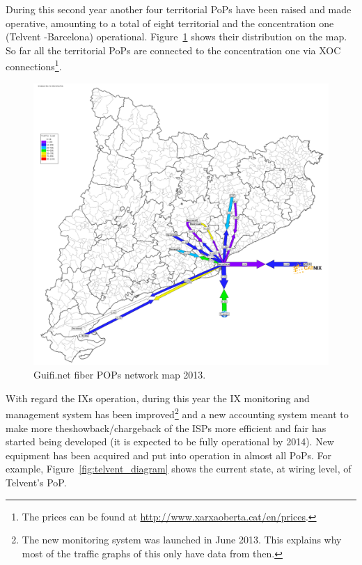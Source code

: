 During this second year another four territorial PoPs have been raised and made operative, amounting to a total of eight territorial and the concentration one (Telvent -Barcelona) operational. Figure~\ref{fig:pop_weathermap} shows their distribution on the map. So far all the territorial PoPs are connected to the concentration one via XOC connections\footnote{The prices can be found at \url{http://www.xarxaoberta.cat/en/prices}.}.

\begin{figure}[H]
  \centering
  \includegraphics[width=0.95\linewidth]{sect3/figures/weathermap.png} 
  \caption[Guifi.net fiber POPs network map 2013]{Guifi.net fiber POPs network map 2013.}
  \label{fig:pop_weathermap}
\end{figure}

With regard the IXs operation, during this year the IX monitoring and management system has been improved\footnote{The new monitoring system was launched in June 2013. This explains why most of the traffic graphs of this only have data from then.} and a new accounting system meant to make more theshowback/chargeback of the ISPs more efficient and fair has started being developed (it is expected to be fully operational by 2014). New equipment has been acquired and put into operation in almost all PoPs. For example, Figure~\ref{fig:telvent_diagram} shows the current state, at wiring level, of Telvent's PoP.

